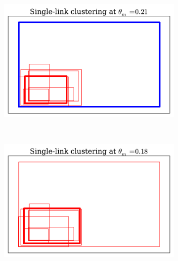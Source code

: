 \begin{figure}[hbt]
    
    \begin{subfigure}[b]{0.30\textwidth}
            \centering
            \includegraphics[width=\textwidth]{visSL021_2}
            \caption{}
            \label{fig:slvqs_sl1}
    \end{subfigure}
    ~ %
    \begin{subfigure}[b]{0.30\textwidth}
            \centering
            \includegraphics[width=\textwidth]{visSL018_2}
            \caption{}
            \label{fig:slvqs_sl2}
    \end{subfigure}
    ~ %

\end{figure}
